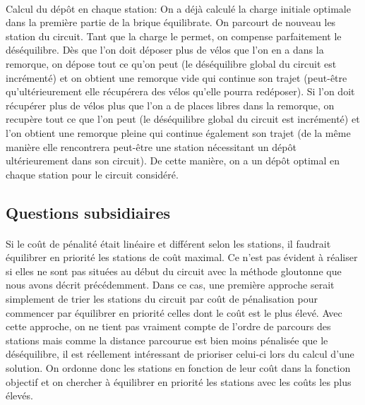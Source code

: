 \documentclass[a4paper, 11pt]{article} %
\begin{document}
\paragraph*{}
Calcul du dépôt en chaque station: On a déjà calculé la charge initiale optimale dans la première partie de la brique équilibrate. On parcourt de nouveau les station du circuit. Tant que la charge le permet, on compense parfaitement le déséquilibre. Dès que l'on doit déposer plus de vélos que l'on en a dans la remorque, on dépose tout ce qu'on peut (le déséquilibre global du circuit est incrémenté) et on obtient une remorque vide qui continue son trajet (peut-être qu'ultérieurement elle récupérera des vélos qu'elle pourra redéposer). Si l'on doit récupérer plus de vélos plus que l'on a de places libres dans la remorque, on recupère tout ce que l'on peut (le déséquilibre global du circuit est incrémenté) et l'on obtient une remorque pleine qui continue également son trajet (de la même manière elle rencontrera peut-être une station nécessitant un dépôt ultérieurement dans son circuit). De cette manière, on a un dépôt optimal en chaque station pour le circuit considéré.



\subsection{Questions subsidiaires}

\paragraph*{}
Si le coût de pénalité était linéaire et différent selon les stations, il faudrait équilibrer en priorité les stations de coût maximal. Ce n'est pas évident à réaliser si elles ne sont pas situées au début du circuit avec la méthode gloutonne que nous avons décrit précédemment. Dans ce cas, une première approche serait simplement de trier les stations du circuit par coût de pénalisation pour commencer par équilibrer en priorité celles dont le coût est le plus élevé. Avec cette approche, on ne tient pas vraiment compte de l'ordre de parcours des stations mais comme la distance parcourue est bien moins pénalisée que le déséquilibre, il est réellement intéressant de prioriser celui-ci lors du calcul d'une solution. On ordonne donc les stations en  fonction de leur coût dans la fonction objectif et on chercher à équilibrer en priorité les stations avec les coûts les plus élevés.
\end{document}

